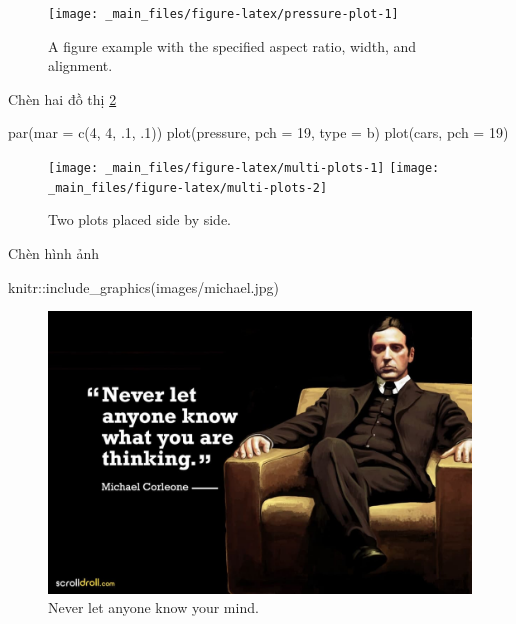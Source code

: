 \documentclass[
]{book}
\newenvironment{Shaded}{\begin{snugshade}}{\end{snugshade}}
\newcommand{\AttributeTok}[1]{\textcolor[rgb]{0.77,0.63,0.00}{#1}}
\newcommand{\DecValTok}[1]{\textcolor[rgb]{0.00,0.00,0.81}{#1}}
\newcommand{\FunctionTok}[1]{\textcolor[rgb]{0.00,0.00,0.00}{#1}}
\newcommand{\NormalTok}[1]{#1}
\newcommand{\SpecialCharTok}[1]{\textcolor[rgb]{0.00,0.00,0.00}{#1}}
\newcommand{\StringTok}[1]{\textcolor[rgb]{0.31,0.60,0.02}{#1}}
\theoremstyle{definition}
\theoremstyle{definition}
\theoremstyle{definition}
\theoremstyle{definition}
\theoremstyle{remark}
\begin{document}
\begin{figure}

{\centering \texttt{[image: \_main\_files/figure-latex/pressure-plot-1]} 

}

\caption{A figure example with the specified aspect ratio, width, and alignment.}\label{fig:pressure-plot}
\end{figure}

Chèn hai đồ thị \ref{fig:multi-plots}

\begin{Shaded}
\begin{Highlighting}[]
\FunctionTok{par}\NormalTok{(}\AttributeTok{mar =} \FunctionTok{c}\NormalTok{(}\DecValTok{4}\NormalTok{, }\DecValTok{4}\NormalTok{, .}\DecValTok{1}\NormalTok{, .}\DecValTok{1}\NormalTok{))}
\FunctionTok{plot}\NormalTok{(pressure, }\AttributeTok{pch =} \DecValTok{19}\NormalTok{, }\AttributeTok{type =} \StringTok{\textquotesingle{}b\textquotesingle{}}\NormalTok{)}
\FunctionTok{plot}\NormalTok{(cars, }\AttributeTok{pch =} \DecValTok{19}\NormalTok{)}
\end{Highlighting}
\end{Shaded}

\begin{figure}
\texttt{[image: \_main\_files/figure-latex/multi-plots-1]} \texttt{[image: \_main\_files/figure-latex/multi-plots-2]} \caption{Two plots placed side by side.}\label{fig:multi-plots}
\end{figure}

Chèn hình ảnh

\begin{Shaded}
\begin{Highlighting}[]
\NormalTok{knitr}\SpecialCharTok{::}\FunctionTok{include\_graphics}\NormalTok{(}\StringTok{\textquotesingle{}images/michael.jpg\textquotesingle{}}\NormalTok{)}
\end{Highlighting}
\end{Shaded}

\begin{figure}
\includegraphics[width=0.328\linewidth]{images/michael} \caption{Never let anyone know your mind.}\label{fig:michael}
\end{figure}
\end{document}
